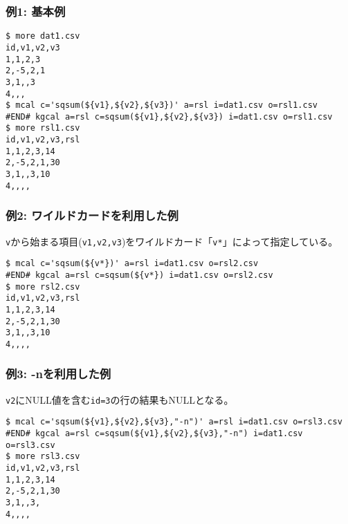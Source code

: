 \subsubsection*{例1: 基本例}



\begin{Verbatim}[baselinestretch=0.7,frame=single]
$ more dat1.csv
id,v1,v2,v3
1,1,2,3
2,-5,2,1
3,1,,3
4,,,
$ mcal c='sqsum(${v1},${v2},${v3})' a=rsl i=dat1.csv o=rsl1.csv
#END# kgcal a=rsl c=sqsum(${v1},${v2},${v3}) i=dat1.csv o=rsl1.csv
$ more rsl1.csv
id,v1,v2,v3,rsl
1,1,2,3,14
2,-5,2,1,30
3,1,,3,10
4,,,,
\end{Verbatim}
\subsubsection*{例2: ワイルドカードを利用した例}

\verb|v|から始まる項目(\verb|v1,v2,v3|)をワイルドカード「\verb|v*|」によって指定している。


\begin{Verbatim}[baselinestretch=0.7,frame=single]
$ mcal c='sqsum(${v*})' a=rsl i=dat1.csv o=rsl2.csv
#END# kgcal a=rsl c=sqsum(${v*}) i=dat1.csv o=rsl2.csv
$ more rsl2.csv
id,v1,v2,v3,rsl
1,1,2,3,14
2,-5,2,1,30
3,1,,3,10
4,,,,
\end{Verbatim}
\subsubsection*{例3: -nを利用した例}

\verb|v2|にNULL値を含む\verb|id=3|の行の結果もNULLとなる。


\begin{Verbatim}[baselinestretch=0.7,frame=single]
$ mcal c='sqsum(${v1},${v2},${v3},"-n")' a=rsl i=dat1.csv o=rsl3.csv
#END# kgcal a=rsl c=sqsum(${v1},${v2},${v3},"-n") i=dat1.csv o=rsl3.csv
$ more rsl3.csv
id,v1,v2,v3,rsl
1,1,2,3,14
2,-5,2,1,30
3,1,,3,
4,,,,
\end{Verbatim}
